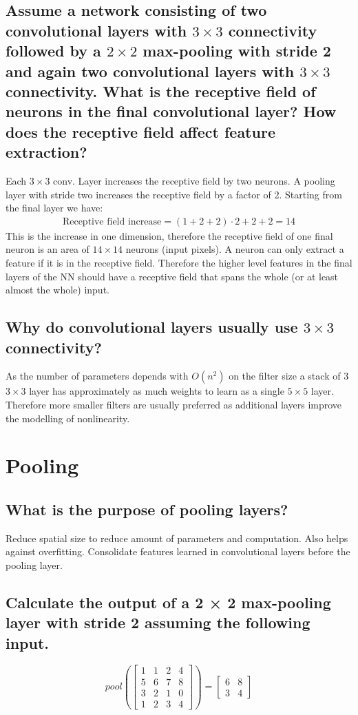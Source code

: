 \subsection{Assume a network consisting of two convolutional layers with $3 \times 3$ connectivity followed by a $2 \times 2$ max-pooling with stride 2 and again two convolutional layers with $3 \times 3$ connectivity. What is the receptive field of neurons in the final convolutional layer? How does the receptive field affect feature extraction? }
Each $3\times 3$ conv. Layer increases the receptive field by two neurons. A pooling layer with stride two increases the receptive field by a factor of 2. Starting from the final layer we have:
\begin{align*}
\text{Receptive field increase} = (1+2+2) \cdot 2 + 2+ 2 = 14
\end{align*}
This is the increase in one dimension, therefore the receptive field of one final neuron is an area of $14\times 14$ neurons (input pixels).
A neuron can only extract a feature if it is in the receptive field. Therefore the higher level features in the final layers of the NN should have a receptive field that spans the whole (or at least almost the whole) input.
\subsection{Why do convolutional layers usually use $3 \times 3$ connectivity?}
As the number of parameters depends with $O(n^2)$ on the filter size a stack of 3 $3\times 3$ layer has approximately as much weights to learn as a single $5\times 5$ layer. Therefore more smaller filters are usually preferred as additional layers improve the modelling of nonlinearity.
%
\section{Pooling}
\subsection{What is the purpose of pooling layers?}
Reduce spatial size to reduce amount of parameters and computation. Also helps against overfitting. Consolidate features learned in convolutional layers before the pooling layer.
\subsection{Calculate the output of a 2 × 2 max-pooling layer with stride 2 assuming the following input.}
\begin{equation}
pool\left(\begin{bmatrix}
1 & 1 & 2 & 4\\
5&6&7&8\\
3&2&1&0\\
1&2&3&4
\end{bmatrix}\right) = \begin{bmatrix}6 & 8 \\3 & 4\end{bmatrix}
\end{equation}
